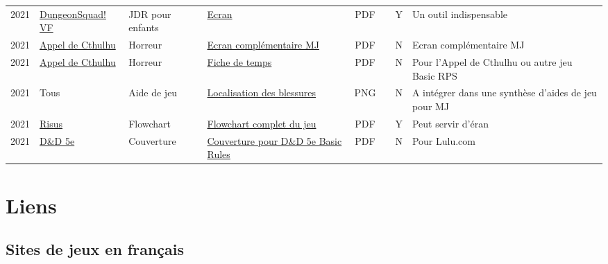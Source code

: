 \documentclass[a4paper, 11pt, twoside]{article}
\begin{document}
\begin{longtable}{p{0.5cm}p{2cm}p{1.5cm}p{4cm}cccp{4cm}}
2021 & \href{https://github.com/orey/jdr-dungeon-squad-fr}{DungeonSquad! VF} & JDR pour enfants & \href{https://rouboudou.itch.io/dungeonsquad-fr}{Ecran} & PDF &  & Y & Un outil indispensable\\
2021 & \href{https://github.com/orey/jdr/tree/master/AppelDeCthulhu}{Appel de Cthulhu} & Horreur & \href{https://github.com/orey/jdr/blob/master/AppelDeCthulhu/AppelDeCthulhu-EcranComplementaire.pdf}{Ecran complémentaire MJ} & PDF &  & N & Ecran complémentaire MJ\\
2021 & \href{https://github.com/orey/jdr/tree/master/AppelDeCthulhu}{Appel de Cthulhu} & Horreur & \href{https://github.com/orey/jdr/blob/master/AppelDeCthulhu/AppelDeCthulhu-FicheDeTemps.pdf}{Fiche de temps} & PDF &  & N & Pour l'Appel de Cthulhu ou autre jeu Basic RPS\\
2021 & Tous & Aide de jeu & \href{https://github.com/orey/jdr/blob/master/Aftermath/LocalisationDesBlessures.png}{Localisation des blessures} & PNG &  & N & A intégrer dans une synthèse d'aides de jeu pour MJ\\
2021 & \href{https://github.com/orey/jdr-risus}{Risus} & Flowchart & \href{https://rouboudou.itch.io/risus-ressources}{Flowchart complet du jeu} & PDF &  & Y & Peut servir d'éran\\
2021 & \href{https://github.com/orey/DandD}{D\&D 5e} & Couverture & \href{https://github.com/orey/DandD/blob/master/DandD\_5e\_BasicEditionLuluCover/Cover.pdf}{Couverture pour D\&D 5e Basic Rules} & PDF &  & N & Pour Lulu.com\\
\end{longtable}

\section{Liens}
\label{sec:org5faea95}

\subsection{Sites de jeux en français}
\label{sec:org3ff09a5}
\end{document}
